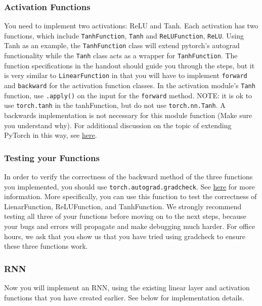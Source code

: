 \documentclass[11pt,addpoints,answers]{exam}
\begin{document}
\subsubsection{Activation Functions}\label{activations}

You need to implement two activations: ReLU and Tanh. Each activation has two functions, which include \texttt{TanhFunction}, \texttt{Tanh} and \texttt{ReLUFunction}, \texttt{ReLU}. Using Tanh as an example, the \texttt{TanhFunction} class will extend pytorch's autograd functionality while the \texttt{Tanh} class acts as a wrapper for \texttt{TanhFunction}. The function specifications in the handout should guide you through the steps, but it is very similar to \texttt{LinearFunction} in that you will have to implement \texttt{forward} and \texttt{backward} for the activation function classes. In the activation module's \texttt{Tanh} function, use \texttt{.apply()} on the input for the \texttt{forward} method. NOTE: it is ok to use \texttt{torch.tanh} in the tanhFunction, but do not use \texttt{torch.nn.Tanh}. A backwards implementation is not necessary for this module function (Make sure you understand why). For additional discussion on the topic of extending PyTorch in this way, see \href{https://pytorch.org/docs/stable/notes/extending.html}{here}.


\subsubsection{Testing your Functions}\label{testing}

In order to verify the correctness of the backward method of the three functions you implemented, you should use \texttt{torch.autograd.gradcheck}. See \href{https://pytorch.org/docs/stable/generated/torch.autograd.gradcheck.gradcheck.html}{here} for more information. More specifically, you can use this function to test the correctness of LienarFunction, ReLUFunction, and TanhFunction. We strongly recommend testing all three of your functions before moving on to the next steps, because your bugs and errors will propagate and make debugging much harder. For office hours, we ask that you show us that you have tried using gradcheck to ensure these three functions work.


\subsubsection{RNN}\label{model}
Now you will implement an RNN, using the existing linear layer and activation functions that you have created earlier. See below for implementation details.
\end{document}

